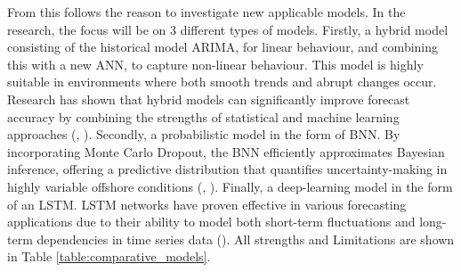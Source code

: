 \vspace{0.25cm}

\noindent From this follows the reason to investigate new applicable models. In the research, the focus will be on 3 different types of models. Firstly, a hybrid model consisting of the historical model ARIMA, for linear behaviour, and combining this with a new ANN, to capture non-linear behaviour. This model is highly suitable in environments where both smooth trends and abrupt changes occur. Research has shown that hybrid models can significantly improve forecast accuracy by combining the strengths of statistical and machine learning approaches (\cite{zhang2003time}, \cite{buyuksahin2019improving}). Secondly, a probabilistic model in the form of BNN. By incorporating Monte Carlo Dropout, the BNN efficiently approximates Bayesian inference, offering a predictive distribution that quantifies uncertainty-making in highly variable offshore conditions (\cite{gal2016dropout}, \cite{mae2022uncertainty}). Finally, a deep-learning model in the form of an LSTM. LSTM networks have proven effective in various forecasting applications due to their ability to model both short-term fluctuations and long-term dependencies in time series data (\cite{siami2019comparison}). All strengths and Limitations are shown in Table \ref{table:comparative_models}. 

